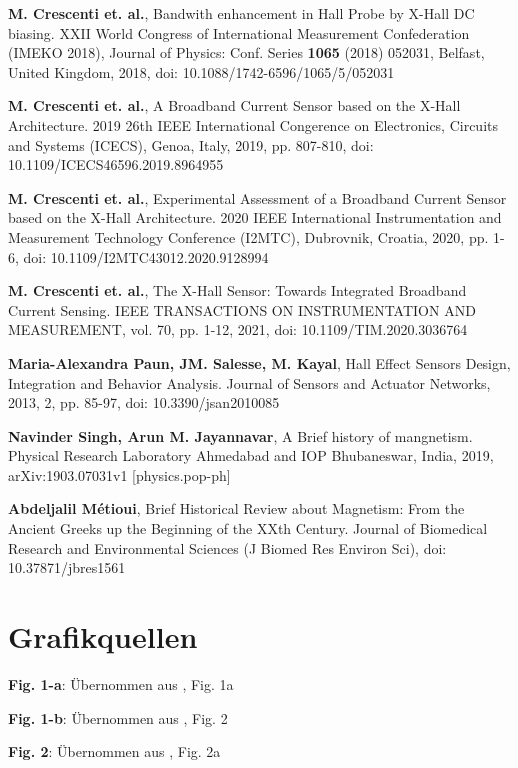 \documentclass[12pt, a4paper]{article}
\begin{document}
		\newpage
		\begin{thebibliography}{}
			\textbf{M. Crescenti et. al.}, Bandwith enhancement in Hall Probe by X-Hall DC biasing. XXII World Congress of International Measurement Confederation (IMEKO 2018), Journal of Physics: Conf. Series \textbf{1065} (2018) 052031, Belfast, United Kingdom, 2018, doi: 10.1088/1742-6596/1065/5/052031
			
			\textbf{M. Crescenti et. al.}, A  Broadband Current Sensor based on the X-Hall Architecture. 2019 26th IEEE International Congerence on Electronics, Circuits and Systems (ICECS), Genoa, Italy, 2019, pp. 807-810, doi: 10.1109/ICECS46596.2019.8964955
			
			\textbf{M. Crescenti et. al.}, Experimental Assessment of a Broadband Current Sensor based on the X-Hall Architecture. 2020 IEEE International Instrumentation and Measurement Technology Conference (I2MTC), Dubrovnik, Croatia, 2020, pp. 1-6, doi: 10.1109/I2MTC43012.2020.9128994
						
			\textbf{M. Crescenti et. al.}, The X-Hall Sensor: Towards Integrated Broadband Current Sensing. IEEE TRANSACTIONS ON INSTRUMENTATION AND MEASUREMENT, vol. 70, pp. 1-12, 2021, doi: 10.1109/TIM.2020.3036764
			
			\textbf{Maria-Alexandra Paun, JM. Salesse, M. Kayal}, Hall Effect Sensors Design, Integration and Behavior Analysis. Journal of Sensors and Actuator Networks, 2013, 2, pp. 85-97, doi: 10.3390/jsan2010085
			
			\textbf{Navinder Singh, Arun M. Jayannavar}, A Brief history of mangnetism. Physical Research Laboratory Ahmedabad and IOP Bhubaneswar, India, 2019, arXiv:1903.07031v1 [physics.pop-ph]
			
			\textbf{Abdeljalil Métioui}, Brief Historical Review about
			Magnetism: From the Ancient Greeks up the Beginning of the XXth Century. Journal of Biomedical Research and Environmental Sciences (J Biomed Res Environ Sci), doi: 10.37871/jbres1561
			
			
			
		\end{thebibliography}
		
		\section*{Grafikquellen}
		\begin{description}
			\item \textbf{Fig. 1-a}: Übernommen aus \cite{cres18}, Fig. 1a
			\item \textbf{Fig. 1-b}: Übernommen aus \cite{cres20}, Fig. 2
			\item \textbf{Fig. 2}: Übernommen aus \cite{cres18}, Fig. 2a
		\end{description}
		
		
\end{document}
